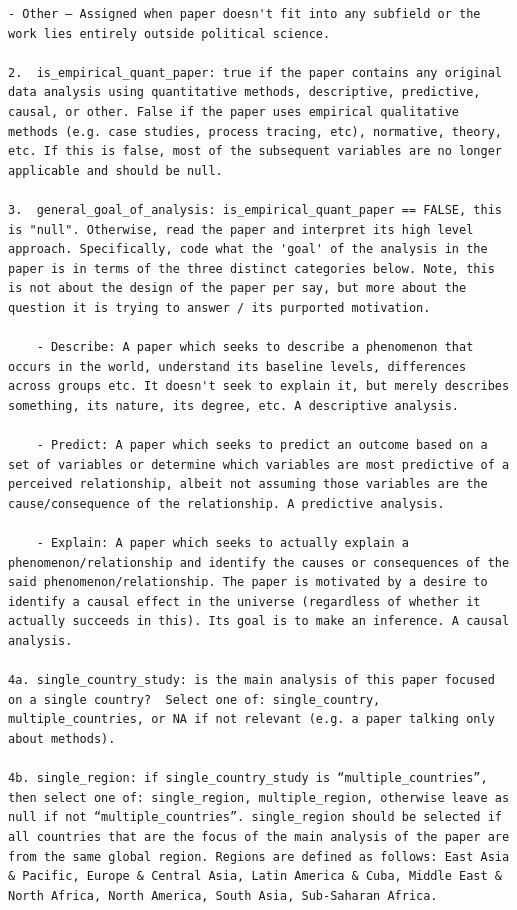 \documentclass[12pt]{article}
\begin{document}
{\begin{Verbatim}[breaklines=true]
    - Other – Assigned when paper doesn't fit into any subfield or the work lies entirely outside political science.

2.  is_empirical_quant_paper: true if the paper contains any original data analysis using quantitative methods, descriptive, predictive, causal, or other. False if the paper uses empirical qualitative methods (e.g. case studies, process tracing, etc), normative, theory, etc. If this is false, most of the subsequent variables are no longer applicable and should be null.

3.  general_goal_of_analysis: is_empirical_quant_paper == FALSE, this is "null". Otherwise, read the paper and interpret its high level approach. Specifically, code what the 'goal' of the analysis in the paper is in terms of the three distinct categories below. Note, this is not about the design of the paper per say, but more about the question it is trying to answer / its purported motivation.

    - Describe: A paper which seeks to describe a phenomenon that occurs in the world, understand its baseline levels, differences across groups etc. It doesn't seek to explain it, but merely describes something, its nature, its degree, etc. A descriptive analysis.

    - Predict: A paper which seeks to predict an outcome based on a set of variables or determine which variables are most predictive of a perceived relationship, albeit not assuming those variables are the cause/consequence of the relationship. A predictive analysis.

    - Explain: A paper which seeks to actually explain a phenomenon/relationship and identify the causes or consequences of the said phenomenon/relationship. The paper is motivated by a desire to identify a causal effect in the universe (regardless of whether it actually succeeds in this). Its goal is to make an inference. A causal analysis.

4a. single_country_study: is the main analysis of this paper focused on a single country?  Select one of: single_country, multiple_countries, or NA if not relevant (e.g. a paper talking only about methods).

4b. single_region: if single_country_study is “multiple_countries”, then select one of: single_region, multiple_region, otherwise leave as null if not “multiple_countries”. single_region should be selected if all countries that are the focus of the main analysis of the paper are from the same global region. Regions are defined as follows: East Asia & Pacific, Europe & Central Asia, Latin America & Cuba, Middle East & North Africa, North America, South Asia, Sub-Saharan Africa.


\end{Verbatim}}
\end{document}
